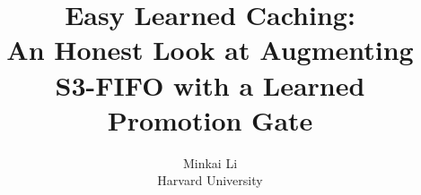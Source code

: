 \documentclass[letterpaper,twocolumn,10pt]{article}
\begin{document}
 
\date{}
 
\title{\Large \bf Easy Learned Caching:\\
  An Honest Look at Augmenting S3-FIFO with a Learned Promotion Gate}
 
\author{
{\rm Minkai Li}\\
Harvard University
}
 
\maketitle
 
 
\end{document}
